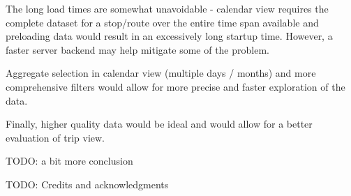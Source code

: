 \documentclass[journal]{vgtc}                %
\begin{document}
The long load times are somewhat unavoidable - calendar view requires the complete dataset for a stop/route over the entire time span available and preloading data would result in an excessively long startup time. However, a faster server backend may help mitigate some of the problem.

Aggregate selection in calendar view (multiple days / months) and more comprehensive filters would allow for more precise and faster exploration of the data.

Finally, higher quality data would be ideal and would allow for a better evaluation of trip view.

TODO: a bit more conclusion

TODO: Credits and acknowledgments




\end{document}
